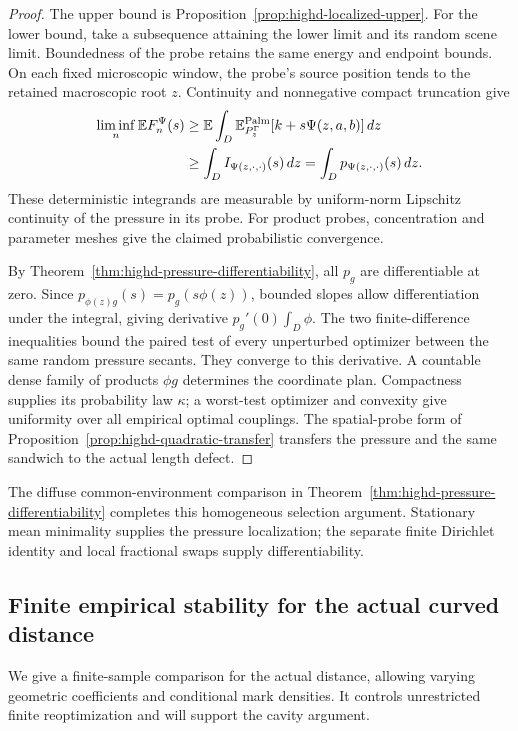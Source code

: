\documentclass[11pt,reqno]{amsart}
\theoremstyle{definition}
\theoremstyle{remark}
\numberwithin{equation}{section}
\newcommand{\E}{\mathbb E}
\begin{document}
\begin{proof}
The upper bound is Proposition~\ref{prop:highd-localized-upper}.
For the lower bound, take a subsequence attaining the lower limit
and its random scene limit. Boundedness of the probe retains the
same energy and endpoint bounds. On each fixed microscopic window,
the probe's source position tends to the retained macroscopic root
\(z\). Continuity and nonnegative compact truncation give
\[
\begin{split}
\liminf_n\E F_n^\Psi(s)
&\ge\E\int_D\E_{P_z^\Gamma}^{\rm Palm}
                        [k+s\Psi(z,a,b)]\,dz\\
&\ge\int_D I_{\Psi(z,\cdot,\cdot)}(s)\,dz
 =\int_D p_{\Psi(z,\cdot,\cdot)}(s)\,dz.
\end{split}
\]
These deterministic integrands are measurable by uniform-norm
Lipschitz continuity of the pressure in its probe. For product
probes, concentration and parameter meshes give the claimed
probabilistic convergence.

By Theorem~\ref{thm:highd-pressure-differentiability}, all \(p_g\)
are differentiable at zero. Since
\(p_{\phi(z)g}(s)=p_g(s\phi(z))\), bounded slopes allow
differentiation under the integral, giving derivative
\(p_g'(0)\int_D\phi\). The two finite-difference inequalities
bound the paired test of every unperturbed optimizer between the
same random pressure secants. They converge to this derivative.
A countable dense family of products \(\phi g\) determines the
coordinate plan. Compactness supplies its probability law
\(\kappa\); a worst-test optimizer and convexity give uniformity
over all empirical optimal couplings. The spatial-probe form of
Proposition~\ref{prop:highd-quadratic-transfer} transfers the pressure
and the same sandwich to the actual length defect.
\end{proof}

The diffuse common-environment comparison in
Theorem~\ref{thm:highd-pressure-differentiability} completes this
homogeneous selection argument. Stationary mean minimality supplies
the pressure localization; the separate finite Dirichlet identity and
local fractional swaps supply differentiability.

\subsection{Finite empirical stability for the actual curved distance}
\label{subsec:highd-curved-empirical-stability}

We give a finite-sample comparison for the actual distance, allowing
varying geometric coefficients and conditional mark densities. It controls
unrestricted finite reoptimization and will support the cavity argument.
\end{document}
